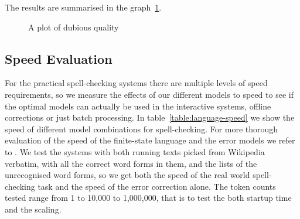 \documentclass[a4paper,12pt]{article}
\begin{document}
The results are summarised in the graph~\ref{fig:quality}.

\begin{figure}
    \centering
    \caption{A plot of dubious quality
    \label{fig:quality}}
\end{figure}


\subsection{Speed Evaluation}

For the practical spell-checking systems there are multiple levels of speed
requirements, so we measure the effects of our different models to speed to see
if the optimal models can actually be used in the interactive systems, offline
corrections or just batch processing. In table~\ref{table:language-speed} we
show the speed of different model combinations for spell-checking. For more
thorough evaluation of the speed of the finite-state language and the error
models we refer to \cite{pirinen2012improving}. We test the systems with both
running texts picked from Wikipedia verbatim, with all the correct word forms
in them, and the lists of the unrecognised word forms, so we get both the speed
of the real world spell-checking task and the speed of the error correction
alone. The token counts tested range from 1 to 10,000 to 1,000,000, that is to
test the both startup time and the scaling.
\end{document}
